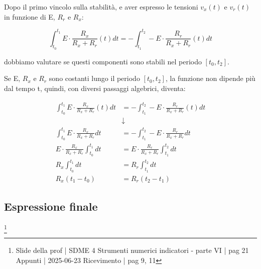 Dopo il primo vincolo sulla stabilità, e aver espresso le tensioni $v_x (t)$ e $v_r (t)$ in funzione di E, $R_r$ e $R_x$: 

{
    \Large 
    \begin{equation}
        \int_{t_0}^{t_1} 
        E \cdot \frac{R_x}{R_x + R_r} (t)
        dt 
        = 
        - 
        \int_{t_1}^{t_2} 
        - E \cdot \frac{R_r}{R_x + R_r} (t)
        dt  
    \end{equation}
}

dobbiamo valutare se questi componenti sono stabili nel periodo $[t_0, t_2]$. \newline 

Se E, $R_x$ e $R_r$ sono costanti lungo il periodo $[t_0, t_2]$, 
la funzione non dipende più dal tempo t, 
quindi, con diversi passaggi algebrici,
diventa:

{
    \Large 
    \begin{equation}
        \begin{split}
        \int_{t_0}^{t_1} 
        E \cdot \frac{R_x}{R_x + R_r} (t)
        dt 
        &= 
        - 
        \int_{t_1}^{t_2} 
        - E \cdot \frac{R_r}{R_x + R_r} (t)
        dt
        \\
        &\downarrow
        \\
        \int_{t_0}^{t_1} 
        E \cdot \frac{R_x}{R_x + R_r}
        dt 
        &= 
        - 
        \int_{t_1}^{t_2} 
        - E \cdot \frac{R_r}{R_x + R_r}
        dt
        \\
        E \cdot \frac{R_x}{R_x + R_r}
        \int_{t_0}^{t_1} 
        dt 
        &= 
        E \cdot \frac{R_r}{R_x + R_r}
        \int_{t_1}^{t_2} 
        dt
        \\
        R_x
        \int_{t_0}^{t_1} 
        dt 
        &= 
        R_r
        \int_{t_1}^{t_2} 
        dt
        \\
        R_x (t_1 - t_0)
        &= 
        R_r (t_2 - t_1)
        \end{split}  
    \end{equation}
}

\newpage 

\subsection{Espressione finale}
\footnote{Slide della prof | SDME 4 Strumenti numerici indicatori - parte VI | pag 21 \\  
Appunti | 2025-06-23 Ricevimento | pag 9, 11}


